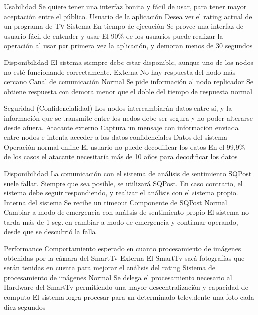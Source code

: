 \begin{enumerate}
\QA
  {Usabilidad} %
  {Se quiere tener una interfaz bonita y fácil de usar, para tener mayor aceptación entre el público.} %
  {Usuario de la aplicación} %
  {Desea ver el rating actual de un programa de TV} %
  {Sistema} %
  {En tiempo de ejecución} %
  {Se provee una interfaz de usuario fácil de entender y usar} %
  {El 90\% de los usuarios puede realizar la operación al usar por primera vez la aplicación, y demoran menos de 30 segundos} %

\QA
  {Disponibilidad} %
  {El sistema siempre debe estar disponible, aunque uno de los nodos no esté funcionando correctamente.} %
  {Externa} %
  {No hay respuesta del nodo más cercano} %
  {Canal de comunicación} %
  {Normal} %
  {Se pide información al nodo replicador} %
  {Se obtiene respuesta con demora menor que el doble del tiempo de respuesta normal} %

\QA
  {Seguridad (Confidencialidad)} %
  {Los nodos intercambiarán datos entre sí, y la información que se transmite entre los nodos debe ser segura y no poder alterarse desde afuera.} %
  {Atacante externo} %
  {Captura un mensaje con información enviada entre nodos e intenta acceder a los datos confidenciales} %
  {Datos del sistema} %
  {Operación normal online} %
  {El usuario no puede decodificar los datos} %
  {En el 99,9\% de los casos el atacante necesitaría más de 10 años para decodificar los datos} %

\QA
  {Disponibilidad} %
  {La comunicación con el sistema de análisis de sentimiento SQPost suele fallar. Siempre que sea posible, se utilizará SQPost. En caso contrario, el sistema debe seguir respondiendo, y realizar el análisis con el sistema propio.} %
  {Interna del sistema} %
  {Se recibe un timeout} %
  {Componente de SQPost} %
  {Normal} %
  {Cambiar a modo de emergencia con análisis de sentimiento propio} %
  {El sistema no tarda más de 1 seg. en cambiar a modo de emergencia y continuar operando, desde que se descubrió la falla} %

\QA
  {Performance} %
  {Comportamiento esperado en cuanto procesamiento de imágenes obtenidas por la cámara del SmartTv} %
  {Externa} %
  {El SmartTv sacá fotografías que serán tenidas en cuenta para mejorar el análisis del rating} %
  {Sistema de procesamiento de imágenes} %
  {Normal} %
  {Se delega el procesamiento necesario al Hardware del SmartTv permitiendo una mayor descentralización y capacidad de computo} %
  {El sistema logra procesar para un determinado televidente una foto cada diez segundos} %


\end{enumerate}
